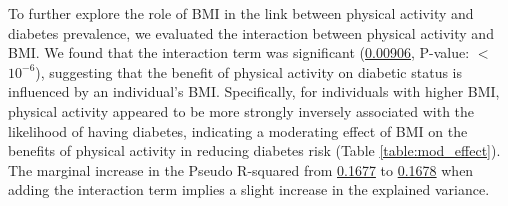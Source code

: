 \documentclass[11pt]{article}
\begin{document}
To further explore the role of BMI in the link between physical activity and diabetes prevalence, we evaluated the interaction between physical activity and BMI. We found that the interaction term was significant (\hyperlink{C3a}{0.00906}, P-value: $<$\hyperlink{C3d}{$10^{-6}$}), suggesting that the benefit of physical activity on diabetic status is influenced by an individual's BMI. Specifically, for individuals with higher BMI, physical activity appeared to be more strongly inversely associated with the likelihood of having diabetes, indicating a moderating effect of BMI on the benefits of physical activity in reducing diabetes risk (Table {}\ref{table:mod_effect}). The marginal increase in the Pseudo R-squared from \hyperlink{R1a}{0.1677} to \hyperlink{R2a}{0.1678} when adding the interaction term implies a slight increase in the explained variance.
\end{document}
